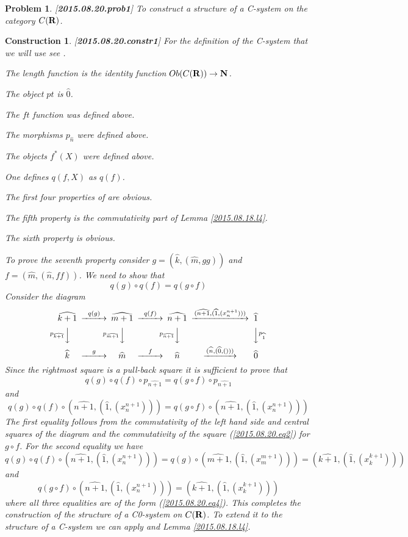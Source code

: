 \documentclass[11pt]{article}
\newtheorem{problem}[proposition]{Problem}
\newtheorem{construction}[proposition]{Construction}
\newcommand{\llabel}[1]{\label{#1}[{\bf #1}]}
\newcommand{\sr}{\rightarrow}
\newcommand{\nn}{{\bf N\rm}}
\newcommand{\rr}{{\bf R}}
\newcommand{\wh}{\widehat}
\begin{document}
%
\begin{problem}
\llabel{2015.08.20.prob1}
To construct a structure of a C-system on the category $C(\rr)$.
\end{problem}
%
\begin{construction}\rm
\llabel{2015.08.20.constr1}
For the definition of the C-system that we will use see \cite[Def. 2.1 and Def. 2.3]{Csubsystems}. 

The length function is the identity function $Ob(C(\rr))\sr \nn$. 

The object $pt$ is $\wh{0}$. 

The $ft$ function was defined above. 

The morphisms $p_{\wh{n}}$ were defined above. 

The objects $f^*(X)$ were defined above. 

One defines $q(f,X)$ as $q(f)$. 

The first four properties of \cite[Def. 2.1]{Csubsystems} are obvious. 

The fifth property is the commutativity part of Lemma  \ref{2015.08.18.l4}. 

The sixth property is obvious. 

To prove the seventh property consider $g=(\wh{k},(\wh{m},gg))$ and $f=(\wh{m},(\wh{n},ff))$. We need to show that
%
$$q(g)\circ q(f)=q(g\circ f)$$
%
Consider the diagram
%
$$
\begin{CD}
\wh{k+1} @>q(g)>> \wh{m+1} @>q(f)>> \wh{n+1} @>(\wh{n+1},(\wh{1},(x_n^{n+1})))>> \wh{1}\\
@Vp_{\wh{k+1}}VV @Vp_{\wh{m+1}}VV @Vp_{\wh{n+1}}VV @VVp_{\wh{1}}V\\
\wh{k} @>g>> \wh{m} @>f>> \wh{n} @>(\wh{n},(\wh{0},()))>> \wh{0}
\end{CD}
$$
%
Since the rightmost square is a pull-back square it is sufficient to prove that
%
$$q(g)\circ q(f)\circ p_{\wh{n+1}}=q(g\circ f)\circ p_{\wh{n+1}}$$
%
and
%
$$q(g)\circ q(f)\circ (\wh{n+1},(\wh{1},(x_n^{n+1})))=q(g\circ f)\circ (\wh{n+1},(\wh{1},(x_n^{n+1})))$$
%
The first equality follows from the commutativity of the left hand side and central squares of the diagram and the commutativity of the square (\ref{2015.08.20.eq2}) for $g\circ f$. For the second equality we have
%
$$q(g)\circ q(f)\circ (\wh{n+1},(\wh{1},(x_n^{n+1})))=q(g)\circ (\wh{m+1},(\wh{1},(x_m^{m+1})))=(\wh{k+1},(\wh{1},(x_k^{k+1})))$$
%
and
%
$$q(g\circ f)\circ (\wh{n+1},(\wh{1},(x_n^{n+1})))=(\wh{k+1},(\wh{1},(x_k^{k+1})))$$
%
where all three equalities are of the form (\ref{2015.08.20.eq4}). This completes the construction of the structure of a  C0-system on $C(\rr)$. To extend it to the structure of a C-system we can apply \cite[Prop. 2.4]{Csubsystems} and Lemma \ref{2015.08.18.l4}. 
\end{construction}
\end{document}
